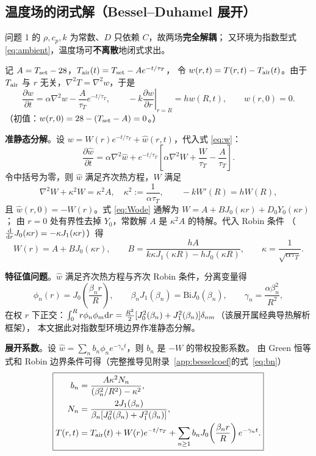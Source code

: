 \documentclass[bwprint]{cumcmthesis}
\begin{document}
\subsection{温度场的闭式解（Bessel--Duhamel 展开）}
\label{sec:bessel}

问题 1 的 $\rho,c_p,k$ 为常数、$D$ 只依赖 $C$，故两场\textbf{完全解耦}；
又环境为指数型式 \eqref{eq:ambient}，温度场可\textbf{不离散}地闭式求出。

记 $A=T_{\rm set}-28$，$T_{\rm air}(t)=T_{\rm set}-Ae^{-t/\tau_T}$，
令 $w(r,t)=T(r,t)-T_{\rm air}(t)$。由于 $T_{\rm air}$ 与 $r$ 无关，$\nabla^2T=\nabla^2w$，于是
\begin{equation}
\frac{\partial w}{\partial t}=\alpha\nabla^2w-\frac{A}{\tau_T}e^{-t/\tau_T},
\qquad
-k\left.\frac{\partial w}{\partial r}\right|_{r=R}=hw(R,t),
\qquad
w(r,0)=0 .
\label{eq:w}
\end{equation}
（初值：$w(r,0)=28-(T_{\rm set}-A)=0$。）

\textbf{准静态分解}。设 $w=W(r)e^{-t/\tau_T}+\hat w(r,t)$，代入式 \eqref{eq:w}：
\[
\frac{\partial\hat w}{\partial t}=\alpha\nabla^2\hat w
+e^{-t/\tau_T}\left[\alpha\nabla^2W+\frac{W}{\tau_T}-\frac{A}{\tau_T}\right].
\]
令中括号为零，则 $\hat w$ 满足齐次热方程，$W$ 满足
\begin{equation}
\nabla^2W+\kappa^2W=\kappa^2A,\quad \kappa^2:=\frac{1}{\alpha\tau_T},
\qquad
-kW'(R)=hW(R),
\label{eq:Wode}
\end{equation}
且 $\hat w(r,0)=-W(r)$。式 \eqref{eq:Wode} 通解为 $W=A+BJ_0(\kappa r)+D_0Y_0(\kappa r)$；
由 $r=0$ 处有界性去掉 $Y_0$，常数解 $A$ 是 $\kappa^2A$ 的特解。代入 Robin 条件
（$\frac{\rm d}{{\rm d}r}J_0(\kappa r)=-\kappa J_1(\kappa r)$）得
\begin{equation}
\boxed{\;W(r)=A+BJ_0(\kappa r),\qquad
B=\frac{hA}{k\kappa J_1(\kappa R)-hJ_0(\kappa R)},\qquad
\kappa=\frac{1}{\sqrt{\alpha\tau_T}}.\;}
\label{eq:W}
\end{equation}

\textbf{特征值问题}。$\hat w$ 满足齐次热方程与齐次 Robin 条件，分离变量得
\begin{equation}
\phi_n(r)=J_0\!\left(\frac{\beta_nr}{R}\right),
\qquad
\beta_nJ_1(\beta_n)=\mathrm{Bi}J_0(\beta_n),
\qquad
\gamma_n=\frac{\alpha\beta_n^2}{R^2},
\label{eq:eig}
\end{equation}
在权 $r$ 下正交：$\int_0^Rr\phi_n\phi_m{\rm d}r=\frac{R^2}{2}
[J_0^2(\beta_n)+J_1^2(\beta_n)]\delta_{nm}$（该展开属经典导热解析框架\cite{carslaw}），
本文据此对指数型环境边界作准静态分解。

\textbf{展开系数}。设 $\hat w=\sum_nb_n\phi_ne^{-\gamma_nt}$，则 $b_n$ 是 $-W$ 的带权投影系数。
由 Green 恒等式和 Robin 边界条件可得（完整推导见附录~\ref{app:besselcoef}的式~\eqref{eq:bn}）
\begin{equation}
\boxed{\begin{aligned}
b_n&=\frac{A\kappa^2N_n}{(\beta_n^2/R^2)-\kappa^2},\\
N_n&=\frac{2J_1(\beta_n)}{\beta_n[J_0^2(\beta_n)+J_1^2(\beta_n)]},\\
T(r,t)&=T_{\rm air}(t)+W(r)e^{-t/\tau_T}
+\sum_{n\ge1}b_nJ_0\!\left(\frac{\beta_nr}{R}\right)e^{-\gamma_nt}.
\end{aligned}}
\label{eq:Tsol}
\end{equation}
\end{document}
